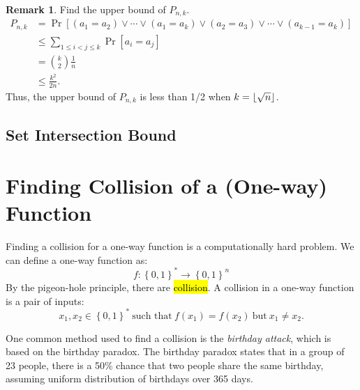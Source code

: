\documentclass[12pt,openany]{book}
\DeclarePairedDelimiter{\floor}{\lfloor}{\rfloor}
\theoremstyle{definition}
\newtheorem{remark}{Remark}[chapter]
\newcommand{\set}[1]{\left\{#1\right\}}
\newcommand{\of}[1]{\left( #1 \right)}
\begin{document}
	\begin{remark}
		Find the upper bound of $P_{n,k}$. \begin{align*}
		P_{n,k}
		&=\Pr\left[(a_1=a_2)\lor\cdots\lor(a_1=a_k)\lor(a_2=a_3)\lor\cdots\lor(a_{k-1}=a_k)\right]\\
		&\leq\sum_{1\leq i< j\leq k}\Pr\left[a_i=a_j\right]\\
		&=\binom{k}{2}\frac{1}{n}\\
		&\leq\frac{k^2}{2n}.
		\end{align*} Thus, the upper bound of $P_{n,k}$ is less than 1/2 when $k=\floor*{\sqrt{n}}$.
	\end{remark}
	
	\subsection{Set Intersection Bound}
	
	\newpage
	\section{Finding Collision of a (One-way) Function}
	
	Finding a collision for a one-way function is a computationally hard problem. We can define a one-way function as:
	\[
	f : \set{0,1}^*\to \set{0,1}^n
	\] By the pigeon-hole principle, there are \hl{collision}. A collision in a one-way function is a pair of inputs:
	\[
	x_1,x_2\in\set{0,1}^*\ \text{such that}\ f\of{x_1}=f\of{x_2}\ \text{but}\ x_1\neq x_2.
	\]
	
	One common method used to find a collision is the \textit{birthday attack}, which is based on the birthday paradox. The birthday paradox states that in a group of 23 people, there is a 50\% chance that two people share the same birthday, assuming uniform distribution of birthdays over 365 days.
	
\end{document}
